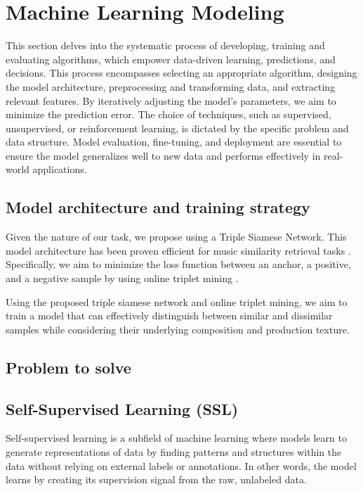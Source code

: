 \section{Machine Learning Modeling}

This section delves into the systematic process of developing, training and evaluating algorithms, which empower data-driven learning, predictions, and decisions. This process encompasses selecting an appropriate algorithm, designing the model architecture, preprocessing and transforming data, and extracting relevant features. By iteratively adjusting the model's parameters, we aim to minimize the prediction error. The choice of techniques, such as supervised, unsupervised, or reinforcement learning, is dictated by the specific problem and data structure. Model evaluation, fine-tuning, and deployment are essential to ensure the model generalizes well to new data and performs effectively in real-world applications.


\subsection{Model architecture and training strategy}

Given the nature of our task, we propose using a Triple Siamese Network. This model architecture has been proven efficient for music similarity retrieval tasks \cite{contentmusicsimtriplet2020}. Specifically, we aim to minimize the loss function between an anchor, a positive, and a negative sample by using online triplet mining \cite{Sikaroudi2020OfflinePatches}.

Using the proposed triple siamese network and online triplet mining, we aim to train a model that can effectively distinguish between similar and dissimilar samples while considering their underlying composition and production texture.

\subsection{Problem to solve}

\subsection{Self-Supervised Learning (SSL)}

Self-supervised learning is a subfield of machine learning where models learn to generate representations of data by finding patterns and structures within the data without relying on external labels or annotations. In other words, the model learns by creating its supervision signal from the raw, unlabeled data.\cite{audioselfsupsurvey}

